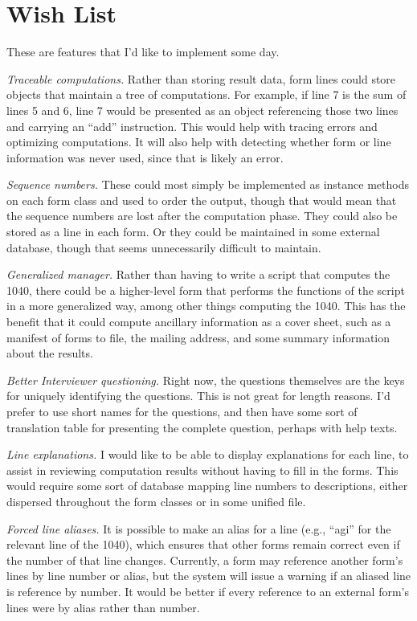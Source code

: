 \section{Wish List}

These are features that I'd like to implement some day.

\emph{Traceable computations.} Rather than storing result data, form lines could
store objects that maintain a tree of computations. For example, if line 7 is
the sum of lines 5 and 6, line 7 would be presented as an object referencing
those two lines and carrying an ``add'' instruction. This would help with
tracing errors and optimizing computations. It will also help with detecting
whether form or line information was never used, since that is likely an error.

\emph{Sequence numbers.} These could most simply be implemented as instance
methods on each form class and used to order the output, though that would mean
that the sequence numbers are lost after the computation phase. They could also
be stored as a line in each form. Or they could be maintained in some external
database, though that seems unnecessarily difficult to maintain.

\emph{Generalized manager.} Rather than having to write a script that computes
the 1040, there could be a higher-level form that performs the functions of the
script in a more generalized way, among other things computing the 1040. This
has the benefit that it could compute ancillary information as a cover sheet,
such as a manifest of forms to file, the mailing address, and some summary
information about the results.

\emph{Better Interviewer questioning.} Right now, the questions themselves are
the keys for uniquely identifying the questions. This is not great for length
reasons. I'd prefer to use short names for the questions, and then have some
sort of translation table for presenting the complete question, perhaps with
help texts.

\emph{Line explanations.} I would like to be able to display explanations for
each line, to assist in reviewing computation results without having to fill in
the forms. This would require some sort of database mapping line numbers to
descriptions, either dispersed throughout the form classes or in some unified
file.

\emph{Forced line aliases.} It is possible to make an alias for a line (e.g.,
``agi'' for the relevant line of the 1040), which ensures that other forms
remain correct even if the number of that line changes. Currently, a form may
reference another form's lines by line number or alias, but the system will
issue a warning if an aliased line is reference by number. It would be better if
every reference to an external form's lines were by alias rather than number.

